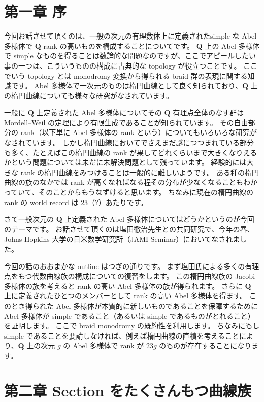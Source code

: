 \documentclass[uplatex,dvipdfmx]{jlreq}
\begin{document}
\medskip

\section*{第一章 序}

今回お話させて頂くのは、一般の次元の有理数体上に定義されたsimple な Abel 多様体で $\mathbf{Q}$-rank の高いものを構成することについてです。
$\mathbf{Q}$ 上の Abel 多様体で simple なものを得ることは数論的な問題なのですが、ここでアピールしたい事の一つは、こういうものの構成に古典的な topology が役立つことです。
ここでいう topology とは monodromy 変換から得られる braid 群の表現に関する知識です。
Abel 多様体で一次元のものは楕円曲線として良く知られており、$\mathbf{Q}$ 上の楕円曲線についても様々な研究がなされています。

一般に $\mathbf{Q}$ 上定義された Abel 多様体についてその $\mathbf{Q}$ 有理点全体のなす群は Mordell--Weil の定理により有限生成であることが知られています。
その自由部分の rank（以下単に Abel 多様体の rank という）についてもいろいろな研究がなされています。
しかし楕円曲線においてでさえまだ謎につつまれている部分も多く、たとえばこの楕円曲線の rank が果してどれくらいまで大きくなりえるかという問題については未だに未解決問題として残っています。
経験的には大きな rank の楕円曲線をみつけることは一般的に難しいようです。
ある種の楕円曲線の族のなかでは rank が高くなればなる程その分布が少なくなることもわかっていて、そのことからもうなずけると思います。
ちなみに現在の楕円曲線の rank の world record は 23（?）あたりです。

さて一般次元の $\mathbf{Q}$ 上定義された Abel 多様体についてはどうかというのが今回のテーマです。
お話させて頂くのは塩田徹治先生との共同研究で、今年の春、Johns Hopkins 大学の日米数学研究所（JAMI Seminar）においてなされました。

今回の話のおおまかな outline はつぎの通りです。
まず塩田氏による多くの有理点をもつ代数曲線族の構成についての復習をします。
この楕円曲線族の Jacobi 多様体の族を考えると rank の高い Abel 多様体の族が得られます。
さらに $\mathbf{Q}$ 上に定義されたひとつのメンバーとして rank の高い Abel 多様体を得ます。
このとき得られた Abel 多様体が本質的に新しいものであることを保障するために Abel 多様体が simple であること（あるいは simple であるものがとれること）を証明します。
ここで braid monodromy の既約性を利用します。
ちなみにもし simple であることを要請しなければ、例えば楕円曲線の直積を考えることにより、$\mathbf{Q}$ 上の次元 $g$ の Abel 多様体で rank が $23g$ のものが存在することになります。


\section*{第二章 Section をたくさんもつ曲線族}
\end{document}
